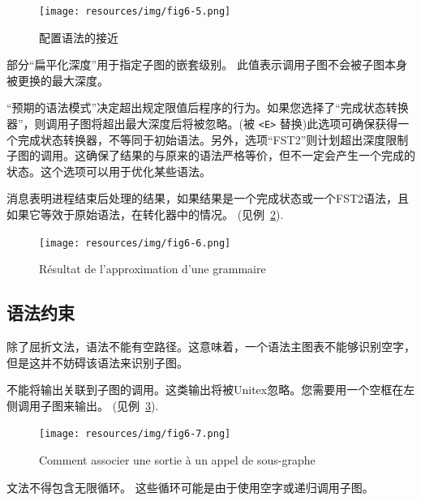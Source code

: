 \bigskip
\begin{figure}[!h]
\begin{center}
\texttt{[image: resources/img/fig6-5.png]}
\caption{配置语法的接近\label{fig-flatten-configuration}}
\end{center}
\end{figure}

\noindent 部分“扁平化深度”用于指定子图的嵌套级别。
此值表示调用子图不会被子图本身被更换的最大深度。


\bigskip
\noindent “预期的语法模式”决定超出规定限值后程序的行为。如果您选择了“完成状态转换器”，则调用子图将超出最大深度后将被忽略。(被 \verb+<E>+ 替换)此选项可确保获得一个完成状态转换器，不等同于初始语法。另外，选项“FST2”则计划超出深度限制子图的调用。这确保了结果的与原来的语法严格等价，但不一定会产生一个完成的状态。这个选项可以用于优化某些语法。

\bigskip
\noindent 消息表明进程结束后处理的结果，如果结果是一个完成状态或一个FST2语法，且如果它等效于原始语法，在转化器中的情况。 (见例~\ref{fig-flatten-result}).


\bigskip
\begin{figure}[!h]
\begin{center}
\texttt{[image: resources/img/fig6-6.png]}
\caption{Résultat de l’approximation d’une grammaire\label{fig-flatten-result}}
\end{center}
\end{figure}


\subsection{语法约束}
除了屈折文法，语法不能有空路径。这意味着，一个语法主图表不能够识别空字，但是这并不妨碍该语法来识别子图。


\bigskip
\noindent 不能将输出关联到子图的调用。这类输出将被Unitex忽略。您需要用一个空框在左侧调用子图来输出。 (见例~\ref{fig-subgraph-output}).

\bigskip
\begin{figure}[!h]
\begin{center}
\texttt{[image: resources/img/fig6-7.png]}
\caption{Comment associer une sortie à un appel de sous-graphe\label{fig-subgraph-output}}
\end{center}
\end{figure}

\noindent 
文法不得包含无限循环。
这些循环可能是由于使用空字或递归调用子图。


